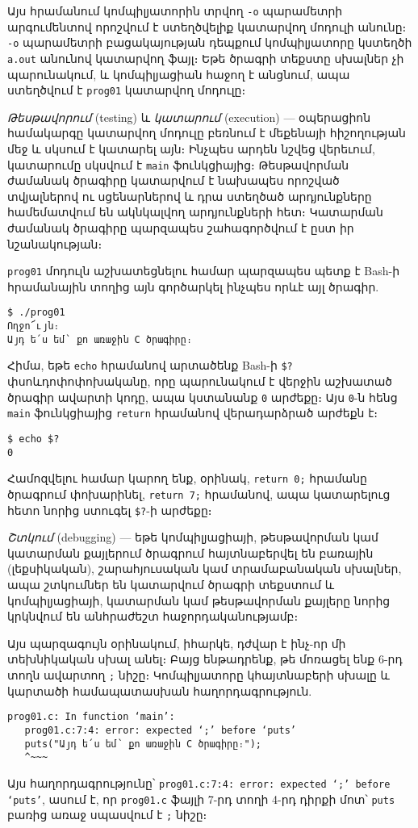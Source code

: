 Այս հրամանում կոմպիլյատորին տրվող \verb|-o| պարամետրի արգումենտով որոշվում է ստեղծվելիք կատարվող մոդուլի անունը։ \verb|-o| պարամետրի բացակայության դեպքում կոմպիլյատորը կստեղծի \verb|a.out| անունով կատարվող ֆայլ։ Եթե ծրագրի տեքստը սխալներ չի պարունակում, և կոմպիլյացիան հաջող է անցնում, ապա ստեղծվում է \verb|prog01| կատարվող մոդուլը։

\emph{Թեսթավորում} (testing) և \emph{կատարում} (execution) --- օպերացիոն համակարգը կատարվող մոդուլը բեռնում է մեքենայի հիշողության մեջ և սկսում է կատարել այն։ Ինչպես արդեն նշվեց վերեւում, կատարումը սկսվում է \texttt{main} ֆունկցիայից։ Թեսթավորման ժամանակ ծրագիրը կատարվում է նախապես որոշված տվյալներով ու սցենարներով և դրա ստեղծած արդյունքները համեմատվում են ակնկալվող արդյունքների հետ։ Կատարման ժամանակ ծրագիրը պարզապես շահագործվում է ըստ իր նշանակության։

\texttt{prog01} մոդուլն աշխատեցնելու համար պարզապես պետք է Bash-ի հրամանային տողից այն գործարկել ինչպես որևէ այլ ծրագիր.

\begin{Verbatim}
$ ./prog01
Ողջո՜ւյն։
Այդ ե՛ս եմ՝ քո առաջին C ծրագիրը։
\end{Verbatim}

Հիմա, եթե \texttt{echo} հրամանով արտածենք Bash-ի \verb|$?| փսոևդոփոփոխականը, որը պարունակում է վերջին աշխատած ծրագիր ավարտի կոդը, ապա կստանանք \texttt{0} արժեքը։ Այս \texttt{0}-ն հենց \texttt{main} ֆունկցիայից \texttt{return} հրամանով վերադարձրած արժեքն է։

\begin{Verbatim}
$ echo $?
0
\end{Verbatim}

Համոզվելու համար կարող ենք, օրինակ, \texttt{return 0;} հրամանը ծրագրում փոխարինել, \texttt{return 7;} հրամանով, ապա կատարելուց հետո նորից ստուգել \verb|$?|-ի արժեքը։

\emph{Շտկում} (debugging) --- եթե կոմպիլյացիայի, թեսթավորման կամ կատարման քայլերում ծրագրում հայտնաբերվել են բառային (լեքսիկական), շարահյուսական կամ տրամաբանական սխալներ,  ապա շտկումներ են կատարվում ծրագրի տեքստում և կոմպիլյացիայի, կատարման կամ թեսթավորման քայլերը նորից կրկնվում են անհրաժեշտ հաջորդականությամբ։

Այս պարզագույն օրինակում, իհարկե, դժվար է ինչ-որ մի տեխնիկական սխալ անել։ Բայց ենթադրենք, թե մոռացել ենք 6-րդ տողն ավարտող \verb|;| նիշը։ Կոմպիլյատորը կհայտնաբերի սխալը և կարտածի համապատասխան հաղորդագրություն.

\begin{Verbatim}
prog01.c: In function ‘main’:
   prog01.c:7:4: error: expected ‘;’ before ‘puts’
   puts("Այդ ե՛ս եմ՝ քո առաջին C ծրագիրը։");
   ^~~~
\end{Verbatim}

Այս հաղորդագրությունը՝ \texttt{prog01.c:7:4: error: expected ‘;’ before ‘puts’}, ասում է, որ \texttt{prog01.c} ֆայլի 7-րդ տողի 4-րդ դիրքի մոտ՝ \texttt{puts} բառից առաջ սպասվում է \verb|;| նիշը։
